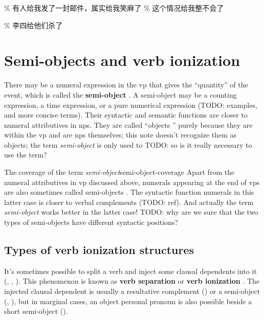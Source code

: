\documentclass[UTF8, a4paper, oneside, scheme=plain]{ctexrep}
\newcommand*{\citesec}[1]{\S~{#1}}
\newcommand*{\citepage}[1]{p.~{#1}}
\newcommand*{\concept}[1]{\textbf{#1}}
\newcommand*{\term}[1]{\emph{#1}}
\begin{document}
\begin{exe}
    \ex \% 有人给我发了一封邮件，属实给我笑麻了
    \ex \% 这个情况给我整不会了
\end{exe}

\begin{exe}
    \ex\label{ex:verb-phrase.gei.2} \% 李四给他们杀了
\end{exe}


\section{Semi-objects and verb ionization}\label{sec:verb-splitting}

There may be a numeral expression in the \acs{vp}
that gives the ``quantity'' of the event, 
which is called the \concept{semi-object} 
\citep[\citesec{8.6}]{zhudexigrammar}.
A semi-object may be a counting expression, 
a time expression, 
or a pure numerical expression (TODO: examples, and more concise terms).
Their syntactic and semantic functions 
are closer to numeral attributives in \acs{np}s.
They are called ``objects '' purely because they are within the \acs{vp}
and are \acs{np}s themselves;
this note doesn't recognize them as objects;
the term \term{semi-object} is only used to TODO: so is it really necessary to use the term?

\begin{infobox}{The coverage of the term \term{semi-object}}{semi-object-coverage}
    Apart from the numeral attributives in \acs{vp} discussed above, 
    numerals appearing at the end of \acs{vp}s 
    are also sometimes called semi-objects \citep[\citepage{117}]{deng2010formal}.
    The syntactic function numerals in this latter case 
    is closer to verbal complements (TODO: ref).
    And actually the term \term{semi-object} works better in the latter case!
    TODO: why are we sure that the two types of semi-objects have different syntactic positions?
\end{infobox}

\subsection{Types of verb ionization structures}

It's sometimes possible to split a verb 
and inject some clausal dependents into it
(, , ).
This phenomenon is known as 
\concept{verb separation} or \concept{verb ionization} \citet[\citesec{6.5.8}]{chao1965grammar}.
The injected clausal dependent is usually 
a resultative complement () 
or a semi-object
(, ), 
but in marginal cases, 
an object personal pronoun is also possible
beside a short semi-object (). 
\end{document}
